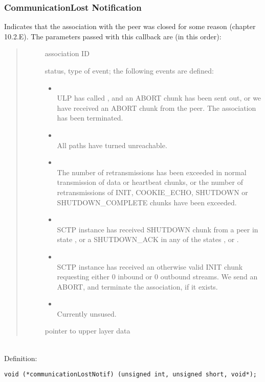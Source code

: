 \documentclass[10pt]{article}
\newcommand{\bv}{\vspace{0,1cm}\noindent \\ Definition:\footnotesize\begin{verbatim}}
\newcommand{\n}{\normalsize}
\newcommand{\no}{ }
\begin{document}
\subsubsection{CommunicationLost Notification}
Indicates that the association with the peer was closed for
some reason (chapter 10.2.E). 
The parameters passed with this callback are (in this order):
\begin{quote} \begin{description} \no
 \item[] association ID
 \item[] status, type of event;
	the following events are defined: 
	\begin{itemize}
	\item {} \\
ULP has called , and an ABORT chunk has been sent
out, or we have received an ABORT chunk from the peer. The association
has been terminated.
	\item {} \\
All paths have turned unreachable.
	\item {}\\
The number of retransmissions has been exceeded in normal
transmission of data or heartbeat chunks, or the number of
retransmissions of INIT, COOKIE_ECHO, SHUTDOWN or SHUTDOWN_COMPLETE
chunks have been exceeded.
	\item {}\\
SCTP instance has received SHUTDOWN chunk from a peer in state
, or a SHUTDOWN_ACK in any of the states
,  or
.
	\item {}\\
SCTP instance has received an otherwise valid INIT chunk requesting either
0 inbound or 0 outbound streams. We send an ABORT, and terminate the
association, if it exists.
	\item {}\\
Currently unsused.
	\end{itemize}
 \item[] pointer to upper layer data
\end{description} \end{quote}
\bv
void (*communicationLostNotif) (unsigned int, unsigned short, void*);
\end{verbatim}\n
\end{document}
